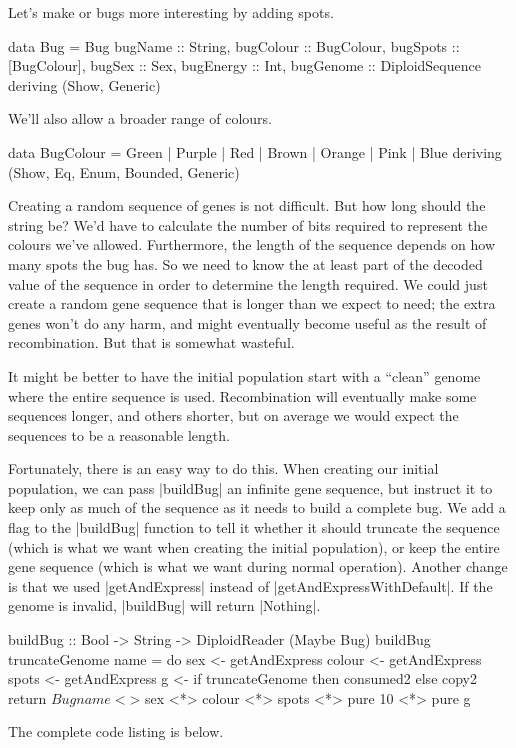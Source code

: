 Let's make or bugs more interesting by adding spots.
\begin{code}
data Bug = Bug
  { 
    bugName :: String,
    bugColour :: BugColour,
    bugSpots :: [BugColour],
    bugSex :: Sex,
    bugEnergy :: Int,
    bugGenome :: DiploidSequence
  } deriving (Show, Generic)
\end{code} 

We'll also allow a broader range of colours.

\begin{code}
data BugColour = Green | Purple | Red | Brown | Orange | Pink | Blue
  deriving (Show, Eq, Enum, Bounded, Generic)
\end{code} 

Creating a random sequence of genes is not difficult.
But how long should the string be?
We'd have to calculate the number of bits required
to represent the colours we've allowed.
Furthermore, the length of the sequence depends
on how many spots the bug has.
So we need to know the at least part of the decoded value of the sequence
in order to determine the length required.
We could just create a random gene sequence that is longer than we expect to need;
the extra genes won't do any harm, and might eventually become useful as the result of recombination.
But that is somewhat wasteful.

It might be better to have the initial population start with a ``clean'' genome
where the entire sequence is used.
Recombination will eventually make some sequences longer, and others shorter,
but on average we would expect the sequences to be a reasonable length.

Fortunately, there is an easy way to do this.
When creating our initial population, we can pass |buildBug| an infinite gene sequence,
but instruct it to keep only as much of the sequence as it needs to build a complete bug.
We add a flag to the |buildBug| function to tell it whether it should truncate the sequence
(which is what we want when creating the initial population),
or keep the entire gene sequence
(which is what we want during normal operation). 
Another change is that we used |getAndExpress| instead of
|getAndExpressWithDefault|.
If the genome is invalid, |buildBug| will return |Nothing|.

\begin{code}
buildBug :: Bool -> String -> DiploidReader (Maybe Bug)
buildBug truncateGenome name = do
  sex <- getAndExpress
  colour <- getAndExpress
  spots <- getAndExpress
  g <- if truncateGenome then consumed2 else copy2
  return $ Bug name <$> sex <*> colour <*> spots <*> pure 10 <*> pure g
\end{code} 

The complete code listing is below.



